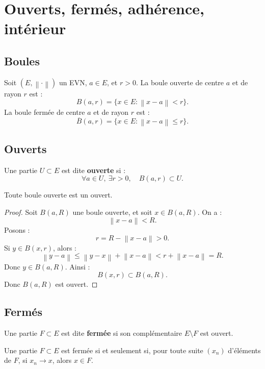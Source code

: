 \documentclass[11pt,a4paper]{article}
\newcommand{\norme}[1]{\left\lVert #1 \right\rVert}
\begin{document}
\section{Ouverts, fermés, adhérence, intérieur}

\subsection{Boules}

\begin{definitionbox}[Boules]
Soit \((E,\norme{\cdot})\) un EVN, \(a\in E\), et \(r>0\).  
La boule ouverte de centre \(a\) et de rayon \(r\) est :
\[
B(a,r)=\{x\in E:\norme{x-a}<r\}.
\]
La boule fermée de centre \(a\) et de rayon \(r\) est :
\[
\overline B(a,r)=\{x\in E:\norme{x-a}\leq r\}.
\]
\end{definitionbox}

\subsection{Ouverts}

\begin{definitionbox}[Ouvert]
Une partie \(U\subset E\) est dite \textbf{ouverte} si :
\[
\forall a\in U,\ \exists r>0,\quad B(a,r)\subset U.
\]
\end{definitionbox}

\begin{theorembox}
Toute boule ouverte est un ouvert.
\end{theorembox}

\begin{proof}
Soit \(B(a,R)\) une boule ouverte, et soit \(x\in B(a,R)\).  
On a :
\[
\norme{x-a}<R.
\]
Posons :
\[
r=R-\norme{x-a}>0.
\]
Si \(y\in B(x,r)\), alors :
\[
\norme{y-a}
\leq \norme{y-x}+\norme{x-a}
<r+\norme{x-a}
=R.
\]
Donc \(y\in B(a,R)\).  
Ainsi :
\[
B(x,r)\subset B(a,R).
\]
Donc \(B(a,R)\) est ouvert.
\end{proof}

\subsection{Fermés}

\begin{definitionbox}[Fermé]
Une partie \(F\subset E\) est dite \textbf{fermée} si son complémentaire \(E\setminus F\) est ouvert.
\end{definitionbox}

\begin{theorembox}
Une partie \(F\subset E\) est fermée si et seulement si, pour toute suite \((x_n)\) d'éléments de \(F\), si \(x_n\to x\), alors \(x\in F\).
\end{theorembox}
\end{document}

